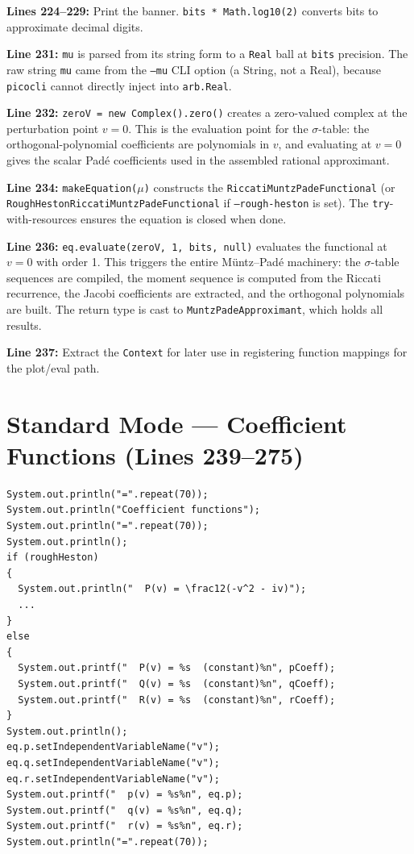 \documentclass[a4paper,11pt]{article}
\begin{document}
\textbf{Lines 224--229:} Print the banner. \texttt{bits * Math.log10(2)}
converts bits to approximate decimal digits.

\textbf{Line 231:} \texttt{mu} is parsed from its string form to a
\texttt{Real} ball at \texttt{bits} precision. The raw string \texttt{mu} came
from the \texttt{--mu} CLI option (a String, not a Real), because
\texttt{picocli} cannot directly inject into \texttt{arb.Real}.

\textbf{Line 232:} \texttt{zeroV = new Complex().zero()} creates a zero-valued
complex at the perturbation point $v = 0$. This is the evaluation point for the
$\sigma$-table: the orthogonal-polynomial coefficients are polynomials in $v$,
and evaluating at $v=0$ gives the scalar Pad\'e coefficients used in the
assembled rational approximant.

\textbf{Line 234:} \texttt{makeEquation($\mu$)} constructs the
\texttt{RiccatiMuntzPadeFunctional} (or
\texttt{RoughHestonRiccatiMuntzPadeFunctional} if \texttt{--rough-heston} is
set). The \texttt{try}-with-resources ensures the equation is closed when done.

\textbf{Line 236:} \texttt{eq.evaluate(zeroV, 1, bits, null)} evaluates the
functional at $v = 0$ with order 1. This triggers the entire M\"untz--Pad\'e
machinery: the $\sigma$-table sequences are compiled, the moment sequence is
computed from the Riccati recurrence, the Jacobi coefficients are extracted,
and the orthogonal polynomials are built. The return type is cast to
\texttt{MuntzPadeApproximant}, which holds all results.

\textbf{Line 237:} Extract the \texttt{Context} for later use in registering
function mappings for the plot/eval path.

\newpage

\section{Standard Mode --- Coefficient Functions (Lines 239--275)}

\begin{lstlisting}[firstnumber=239]
System.out.println("=".repeat(70));
System.out.println("Coefficient functions");
System.out.println("=".repeat(70));
System.out.println();
if (roughHeston)
{
  System.out.println("  P(v) = \frac12(-v^2 - iv)");
  ...
}
else
{
  System.out.printf("  P(v) = %s  (constant)%n", pCoeff);
  System.out.printf("  Q(v) = %s  (constant)%n", qCoeff);
  System.out.printf("  R(v) = %s  (constant)%n", rCoeff);
}
System.out.println();
eq.p.setIndependentVariableName("v");
eq.q.setIndependentVariableName("v");
eq.r.setIndependentVariableName("v");
System.out.printf("  p(v) = %s%n", eq.p);
System.out.printf("  q(v) = %s%n", eq.q);
System.out.printf("  r(v) = %s%n", eq.r);
System.out.println("=".repeat(70));
\end{lstlisting}
\end{document}
